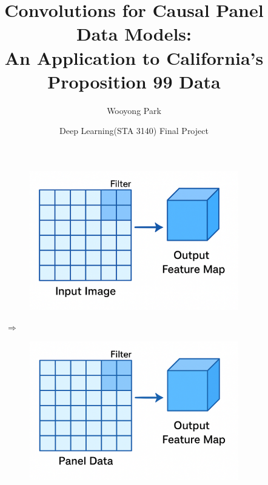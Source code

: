 \documentclass[12pt]{article}
\title{Convolutions for Causal Panel Data Models:\\
	An Application to California's Proposition 99 Data
}
\author{
	Wooyong Park\\
	\multicolumn{1}{p{.7\textwidth}}{\centering Yonsei University} 
}
\date{Deep Learning(STA 3140) Final Project}
\begin{document}
	\begin{singlespace}
		\maketitle
	\end{singlespace}
	
	\begin{figure}[htbp]
		\centering
		\begin{subfigure}[c]{0.3\textwidth}
			\includegraphics[width=\textwidth]{../figures/intro1.png}
		\end{subfigure}
		\hspace{10pt}
		{\Large $\Longrightarrow$}
		\hspace{10pt}
		\begin{subfigure}[c]{0.3\textwidth}
			\includegraphics[width=\textwidth]{../figures/intro2.png}
		\end{subfigure}
	\end{figure}
\end{document}
